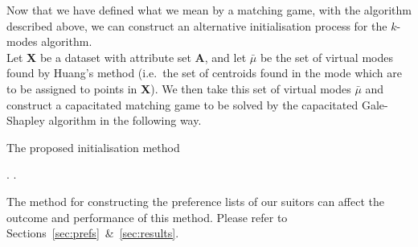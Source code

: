 Now that we have defined what we mean by a matching game, with the algorithm 
described above, we can construct an alternative initialisation process for the 
\(k\)-modes algorithm. \\

Let \textbf{X} be a dataset with attribute set \textbf{A}, and let \(\bar{\mu}\) 
be the set of virtual modes found by Huang's method (i.e.\ the set of centroids 
found in the mode which are to be assigned to points in \textbf{X}). We then 
take this set of virtual modes \(\bar{\mu}\) and construct a capacitated 
matching game to be solved by the capacitated Gale-Shapley algorithm in the 
following way.

\begin{algorithm}[H]
\caption{The proposed initialisation method}
    \begin{algorithmic}[0]
        \EndFor
        \EndFor
        .
            .
        \EndFor
    \end{algorithmic}
\end{algorithm}

\begin{remark}
    The method for constructing the preference lists of our suitors can affect
    the outcome and performance of this method. Please refer to
    Sections~\ref{sec:prefs}~\&~\ref{sec:results}.
\end{remark}
